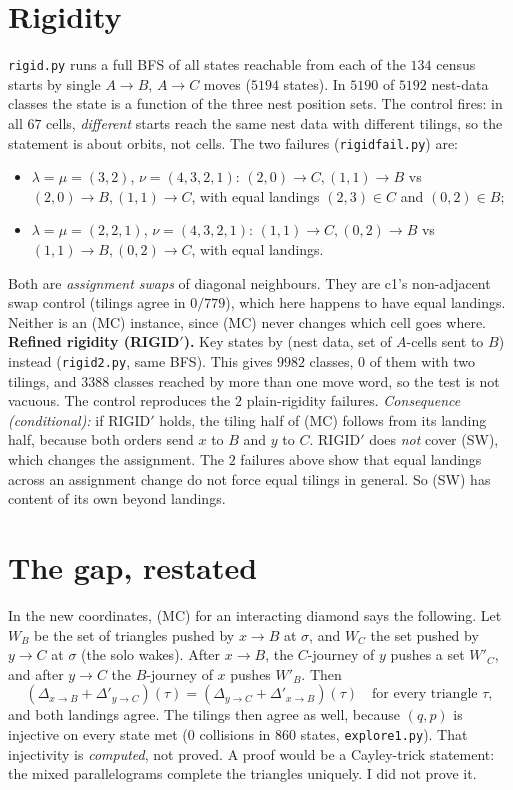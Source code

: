 \documentclass[11pt]{article}
\theoremstyle{definition}
\newcommand{\toB}{\!\to\!B}
\newcommand{\toC}{\!\to\!C}
\begin{document}
\section{Rigidity}\label{sec:rigid}
\texttt{rigid.py} runs a full BFS of all states reachable from each of the $134$ census starts by single $A\toB$, $A\toC$ moves ($5194$
states). In $5190$ of $5192$ nest-data classes the state is a function of the three nest position sets. The control fires: in all $67$ cells,
\emph{different} starts reach the same nest data with different tilings, so the statement is about orbits, not cells. The two failures
(\texttt{rigidfail.py}) are:
\begin{itemize}
\item $\lambda=\mu=(3,2)$, $\nu=(4,3,2,1)$: $(2,0)\toC,(1,1)\toB$ vs $(2,0)\toB,(1,1)\toC$, with equal landings $(2,3)\in C$ and $(0,2)\in B$;
\item $\lambda=\mu=(2,2,1)$, $\nu=(4,3,2,1)$: $(1,1)\toC,(0,2)\toB$ vs $(1,1)\toB,(0,2)\toC$, with equal landings.
\end{itemize}
Both are \emph{assignment swaps} of diagonal neighbours. They are c1's non-adjacent swap control (tilings agree in $0/779$), which here
happens to have equal landings. Neither is an (MC) instance, since (MC) never changes which cell goes where.
\textbf{Refined rigidity (RIGID$'$).} Key states by (nest data, set of $A$-cells sent to $B$) instead (\texttt{rigid2.py}, same BFS). This gives
$9982$ classes, $0$ of them with two tilings, and $3388$ classes reached by more than one move word, so the test is not vacuous. The
control reproduces the $2$ plain-rigidity failures. \emph{Consequence (conditional):} if RIGID$'$ holds, the tiling half of (MC)
follows from its landing half, because both orders send $x$ to $B$ and $y$ to $C$. RIGID$'$ does \emph{not} cover (SW), which changes the
assignment. The $2$ failures above show that equal landings across an assignment change do not force equal tilings in general. So (SW) has
content of its own beyond landings.

\section{The gap, restated}\label{sec:gap}
In the new coordinates, (MC) for an interacting diamond says the following. Let $W_B$ be the set of triangles pushed by $x\toB$ at $\sigma$,
and $W_C$ the set pushed by $y\toC$ at $\sigma$ (the solo wakes). After $x\toB$, the $C$-journey of $y$ pushes a set $W'_C$, and after
$y\toC$ the $B$-journey of $x$ pushes $W'_B$. Then
\[ (\Delta_{x\toB}+\Delta'_{y\toC})(\tau)=(\Delta_{y\toC}+\Delta'_{x\toB})(\tau)\quad\text{for every triangle }\tau,\]
and both landings agree. The tilings then agree as well, because $(q,p)$ is injective on every state met ($0$ collisions in $860$ states,
\texttt{explore1.py}). That injectivity is \emph{computed}, not proved. A proof would be a Cayley-trick statement: the mixed parallelograms
complete the triangles uniquely. I did not prove it.
\end{document}
